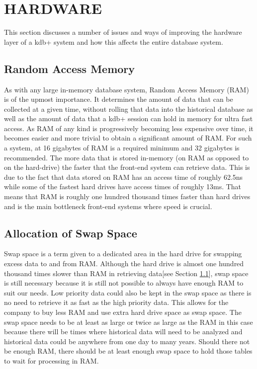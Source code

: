 \section{HARDWARE} %
\label{sec:hardware}
This section discusses a number of issues and ways of improving the hardware layer of a kdb+ system and how this affects the entire database system.

\subsection{Random Access Memory} %
\label{sub:ram}
As with any large in-memory database system, Random Access Memory (RAM) is of the upmost importance.  It determines the amount of data that can be collected at a given time, without rolling that data into the historical database as well as the amount of data that a kdb+ session can hold in memory for ultra fast access.  As RAM of any kind is progressively becoming less expensive over time, it becomes easier and more trivial to obtain a significant amount of RAM.  For such a system, at 16 gigabytes of RAM is a required minimum and 32 gigabytes is recommended.  The more data that is stored in-memory (on RAM as opposed to on the hard-drive) the faster that the front-end system can retrieve data.  This is due to the fact that data stored on RAM has an access time of roughly 62.5ns\cite{ram_speed} while some of the fastest hard drives have access times of roughly 13ms\cite{samsung_hdd}.  That means that RAM is roughly one hundred thousand times faster than hard drives and is the main bottleneck front-end systems where speed is crucial.\newline

\subsection{Allocation of Swap Space} %
\label{sub:swap_space}
Swap space is a term given to a dedicated area in the hard drive for swapping excess data to and from RAM.  Although the hard drive is almost one hundred thousand times slower than RAM in retrieving data[see Section \ref{sub:ram}], swap space is still necessary because it is still not possible to always have enough RAM to suit our needs. Low priority data could also be kept in the swap space as there is no need to retrieve it as fast as the high priority data.  This allows for the company to buy less RAM and use extra hard drive space as swap space.  The swap space needs to be at least as large or twice as large as the RAM in this case because there will be times where historical data will need to be analyzed and historical data could be anywhere from one day to many years.  Should there not be enough RAM, there should be at least enough swap space to hold those tables to wait for processing in RAM.\newline

